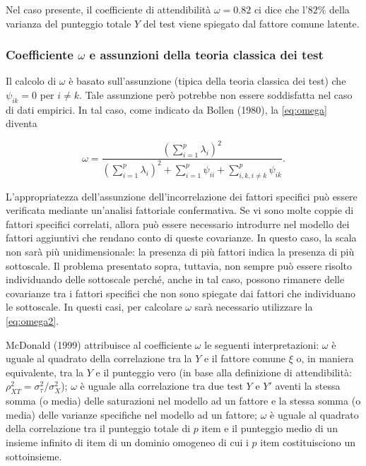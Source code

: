 \documentclass[
  11pt,
]{krantz}
\theoremstyle{definition}
\theoremstyle{definition}
\theoremstyle{definition}
\theoremstyle{definition}
\theoremstyle{remark}
\begin{document}
Nel caso presente, il coefficiente di attendibilità \(\omega=0.82\) ci dice che l'\(82\)\% della varianza del punteggio totale \(Y\) del test viene spiegato dal fattore comune latente.

\hypertarget{coefficiente-omega-e-assunzioni-della-teoria-classica-dei-test}{%
\subsubsection{\texorpdfstring{Coefficiente \(\omega\) e assunzioni della teoria classica dei test}{Coefficiente \textbackslash omega e assunzioni della teoria classica dei test}}\label{coefficiente-omega-e-assunzioni-della-teoria-classica-dei-test}}

Il calcolo di \(\omega\) è basato sull'assunzione (tipica della teoria classica dei test) che \(\psi_{ik}=0\) per \(i\neq k\). Tale assunzione però potrebbe non essere soddisfatta nel caso di dati empirici. In tal caso, come indicato da Bollen (1980), la \eqref{eq:omega} diventa

\begin{equation}
 \omega = \frac{\left( \sum_{i=1}^p \lambda_i \right)^2}{\left( \sum_{i=1}^p \lambda_i \right)^2  + \sum_{i=1}^p \psi_{ii} + \sum_{i, k, i\neq k}^p \psi_{ik}}.
 \label{eq:omega2}
 \end{equation}

L'appropriatezza dell'assunzione dell'incorrelazione dei fattori specifici può essere verificata mediante un'analisi fattoriale confermativa. Se vi sono molte coppie di fattori specifici correlati, allora può essere necessario introdurre nel modello dei fattori aggiuntivi che rendano conto di queste covarianze. In questo caso, la scala non sarà più unidimensionale: la presenza di più fattori indica la presenza di più sottoscale. Il problema presentato sopra, tuttavia, non sempre può essere risolto individuando delle sottoscale perché, anche in tal caso, possono rimanere delle covarianze tra i fattori specifici che non sono spiegate dai fattori che individuano le sottoscale. In questi casi, per calcolare \(\omega\) sarà necessario utilizzare la \eqref{eq:omega2}.

McDonald (1999) attribuisce al coefficiente \(\omega\) le seguenti interpretazioni: \(\omega\) è uguale al quadrato della correlazione tra la \(Y\) e il fattore comune \(\xi\) o, in maniera equivalente, tra la \(Y\) e il punteggio vero (in base alla definizione di attendibilità: \(\rho_{XT}^2=\sigma^2_{\tau}/\sigma^2_X\)); \(\omega\) è uguale alla correlazione tra due test \(Y\) e \(Y'\) aventi la stessa somma (o media) delle saturazioni nel modello ad un fattore e la stessa somma (o media) delle varianze specifiche nel modello ad un fattore; \(\omega\) è uguale al quadrato della correlazione tra il punteggio totale di \(p\) item e il punteggio medio di un insieme infinito di item di un dominio omogeneo di cui i \(p\) item costituisciono un sottoinsieme.
\end{document}

